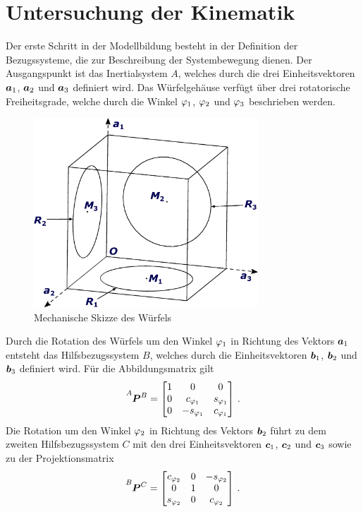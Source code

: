 \section{Untersuchung der Kinematik}
Der erste Schritt in der Modellbildung besteht in der Definition der Bezugssysteme, die zur Beschreibung der Systembewegung dienen. Der Ausgangspunkt ist das Inertialsystem $A$, welches durch die drei Einheitsvektoren $\boldsymbol{a}_{\text{1}}$, $\boldsymbol{a}_{\text{2}}$ und $\boldsymbol{a}_{\text{3}}$ definiert wird. Das Würfelgehäuse verfügt über drei rotatorische Freiheitsgrade, welche durch die Winkel $\varphi_{\text{1}}$, $\varphi_{\text{2}}$ und $\varphi_{\text{3}}$ beschrieben werden. 
\begin{figure}[!h]
\centering
\includegraphics[width=0.75\textwidth]{img/tm_corner_drawing.eps}
\caption{Mechanische Skizze des Würfels}
\end{figure}
Durch die Rotation des Würfels um den Winkel $\varphi_{\text{1}}$ in Richtung des Vektors $\boldsymbol{a}_{\text{1}}$ entsteht das Hilfsbezugssystem $B$, welches durch die Einheitsvektoren $\boldsymbol{b}_{\text{1}}$, $\boldsymbol{b}_{\text{2}}$ und $\boldsymbol{b}_{\text{3}}$ definiert wird. Für die Abbildungsmatrix gilt
\begin{equation}
\pMat{A}{B} = \begin{bmatrix}
1 & 0 & 0 \\ 0 & c_{\varphi\idx1} & s_{\varphi\idx1} \\ 0 & -s_{\varphi\idx1} & c_{\varphi\idx1}
\end{bmatrix} \,.
\end{equation}
Die Rotation um den Winkel $\varphi_{\text{2}}$ in Richtung des Vektors $\boldsymbol{b}_{\text{2}}$ führt zu dem zweiten Hilfsbezugssystem $C$ mit den drei Einheitsvektoren $\boldsymbol{c}_{\text{1}}$, $\boldsymbol{c}_{\text{2}}$ und $\boldsymbol{c}_{\text{3}}$ sowie zu der Projektionsmatrix
\begin{equation}
\pMat{B}{C} = \begin{bmatrix}
c_{\varphi\idx2} & 0 & -s_{\varphi\idx2} \\
0 & 1 & 0 \\
 s_{\varphi\idx2} & 0 & c_{\varphi\idx2}
\end{bmatrix} \,.
\end{equation}

